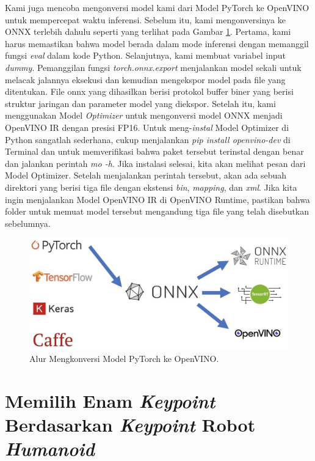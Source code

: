 Kami juga mencoba mengonversi model kami dari Model PyTorch ke OpenVINO untuk mempercepat waktu inferensi. Sebelum itu, kami mengonversinya ke ONNX terlebih dahulu seperti yang terlihat pada Gambar \ref{fig:pytorch-to-openvino}.
Pertama, kami harus memastikan bahwa model berada dalam mode inferensi dengan memanggil fungsi \emph{eval} dalam kode Python.
Selanjutnya, kami membuat variabel input \textit{dummy}. Pemanggilan fungsi \emph{torch.onnx.export} menjalankan model sekali untuk melacak jalannya eksekusi dan kemudian mengekspor model pada file yang ditentukan.
File onnx yang dihasilkan berisi protokol buffer biner yang berisi struktur jaringan dan parameter model yang diekspor.
Setelah itu, kami menggunakan Model \textit{Optimizer} untuk mengonversi model ONNX menjadi OpenVINO IR dengan presisi FP16. Untuk meng-\textit{instal} Model Optimizer di Python sangatlah sederhana, cukup menjalankan
\emph{pip install openvino-dev} di Terminal dan untuk memverifikasi bahwa paket tersebut terinstal dengan benar dan jalankan perintah \emph{mo -h}. Jika instalasi selesai, kita akan melihat pesan dari Model Optimizer.
Setelah menjalankan perintah tersebut, akan ada sebuah direktori yang berisi tiga file dengan ekstensi \emph{bin}, \emph{mapping}, dan \emph{xml}.
Jika kita ingin menjalankan Model OpenVINO IR di OpenVINO Runtime, pastikan bahwa folder untuk memuat model tersebut mengandung tiga file yang telah disebutkan sebelumnya.

\begin{figure}[ht]
  \centering
  \includegraphics[scale=0.4]{gambar/pytorch-onnx-openvino.jpg}
  \caption{Alur Mengkonversi Model PyTorch ke OpenVINO.}
  \label{fig:pytorch-to-openvino}
\end{figure}


\section{Memilih Enam \textit{Keypoint} Berdasarkan \textit{Keypoint} Robot \textit{Humanoid}}
\label{sec:choose-keypoints}

